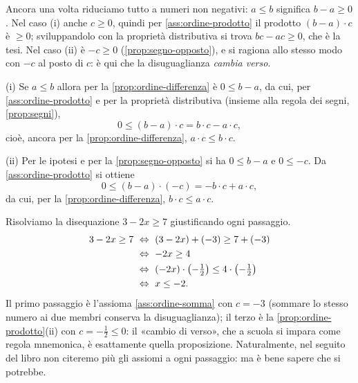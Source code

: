 \begin{schema}
\end{schema}

\begin{strategia}
Ancora una volta riduciamo tutto a numeri non negativi: $a\le b$ significa $b-a\ge0$.
Nel caso (i) anche $c\ge0$, quindi per \ref{ass:ordine-prodotto} il prodotto
$(b-a)\cdot c$ è $\ge0$; sviluppandolo con la proprietà distributiva si trova
$bc-ac\ge0$, che è la tesi. Nel caso (ii) è $-c\ge0$ (\cref{prop:segno-opposto}), e si
ragiona allo stesso modo con $-c$ al posto di $c$: è qui che la disuguaglianza
\emph{cambia verso}.
\end{strategia}

\begin{dimostrazione}
(i) Se $a\le b$ allora per la \cref{prop:ordine-differenza} è $0\le b-a$, da cui, per
\ref{ass:ordine-prodotto} e per la proprietà distributiva (insieme alla regola dei segni,
\cref{prop:segni}),
\[
  0\le (b-a)\cdot c = b\cdot c - a\cdot c,
\]
cioè, ancora per la \cref{prop:ordine-differenza}, $a\cdot c\le b\cdot c$.

(ii) Per le ipotesi e per la \cref{prop:segno-opposto} si ha $0\le b-a$ e $0\le -c$.
Da \ref{ass:ordine-prodotto} si ottiene
\[
  0\le (b-a)\cdot(-c) = -b\cdot c + a\cdot c,
\]
da cui, per la \cref{prop:ordine-differenza}, $b\cdot c\le a\cdot c$.
\end{dimostrazione}

\begin{esempio}
Risolviamo la disequazione $3-2x\ge 7$ giustificando ogni passaggio.
\begin{align*}
  3-2x\ge7 &\ \Leftrightarrow\ (3-2x)+(-3)\ge 7+(-3) \\
           &\ \Leftrightarrow\ -2x\ge4 \\
           &\ \Leftrightarrow\ (-2x)\cdot\bigl(-\tfrac12\bigr)\le 4\cdot\bigl(-\tfrac12\bigr) \\
           &\ \Leftrightarrow\ x\le-2 .
\end{align*}
Il primo passaggio è l'assioma \ref{ass:ordine-somma} con $c=-3$ (sommare lo stesso
numero ai due membri conserva la disuguaglianza); il terzo è la
\cref{prop:ordine-prodotto}(ii) con $c=-\tfrac12\le0$: il «cambio di verso», che a
scuola si impara come regola mnemonica, è esattamente quella proposizione.
Naturalmente, nel seguito del libro non citeremo più gli assiomi a ogni passaggio: ma è bene sapere che si potrebbe.
\end{esempio}

